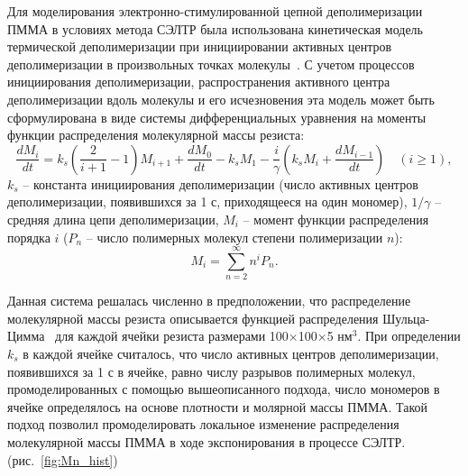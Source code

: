 Для моделирования электронно-стимулированной цепной деполимеризации ПММА в условиях метода СЭЛТР была использована кинетическая модель термической деполимеризации при инициировании активных центров деполимеризации в произвольных точках молекулы~\cite{Boyd_3}. С учетом процессов инициирования деполимеризации, распространения активного центра деполимеризации вдоль молекулы и его исчезновения эта модель может быть сформулирована в виде системы дифференциальных уравнения на моменты функции распределения молекулярной массы резиста:
\begin{equation} \label{eq:moment_equation}
	\frac{d M_i}{d t}=k_s\left(\frac{2}{i+1}-1\right) M_{i+1}+\frac{d M_0}{d t}-k_s M_1 - \frac{i}{\gamma}\left(k_s M_i+\frac{d M_{i-1}}{d t}\right) \quad(i \geq 1),
\end{equation}
$k_s$ -- константа инициирования деполимеризации (число активных центров деполимеризации, появившихся за 1 с, приходящееся на один мономер), $1/\gamma$ -- средняя длина цепи деполимеризации, $M_i$ -- момент функции распределения порядка $i$ ($P_n$ -- число полимерных молекул степени полимеризации $n$):
\begin{equation}
	M_i=\sum_{n=2}^{\infty} n^i P_n.
\end{equation}

Данная система решалась численно в предположении, что распределение молекулярной массы резиста описывается функцией распределения Шульца-Цимма~\cite{Schulz-Zimm_distribution} для каждой ячейки резиста размерами 100$\times$100$\times$5 нм$^3$. При определении $k_s$ в каждой ячейке считалось, что число активных центров деполимеризации, появившихся за 1 с в ячейке, равно числу разрывов полимерных молекул, промоделированных с помощью вышеописанного подхода, число мономеров в ячейке определялось на основе плотности и молярной массы ПММА. Такой подход позволил промоделировать локальное изменение распределения молекулярной массы ПММА в ходе экспонирования в процессе СЭЛТР. (рис.~\ref{fig:Mn_hist})

